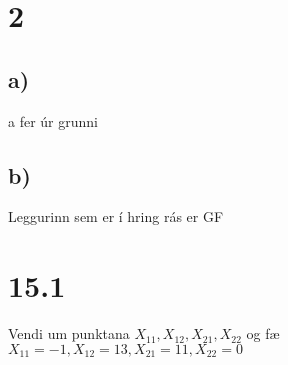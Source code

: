 \documentclass[]{article}
\begin{document}
\section*{2}

\subsection*{a)}

a fer úr grunni \\

\subsection*{b)}

Leggurinn sem er í hring rás er GF \\

\section*{15.1}

Vendi um punktana $X_{11}, X_{12}, X_{21}, X_{22} $ og fæ \\
$X_{11} = -1, X_{12} = 13, X_{21} = 11, X_{22} = 0$
\end{document}
